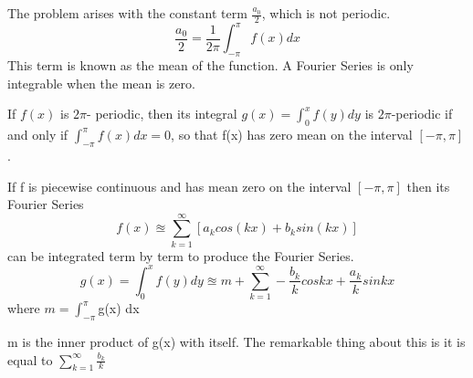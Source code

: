 \documentclass{report}
\begin{document}
The problem arises with the constant term $\frac{a_0}{2}$, which is not periodic.
\[
   \frac{a_0}{2} = \frac{1}{2\pi} \int_{-\pi}^{\pi} f(x) dx
\]
This term is known as the mean of the function. A Fourier Series is only integrable when the mean is zero.
\begin{lemma}
   If $f(x)$  is $2\pi$- periodic, then its integral $g(x) = \int_0^{x} f(y) dy$ is $2\pi$-periodic if and only if $\int_{-\pi}^\pi f(x) dx = 0$, so that f(x) has zero mean on the interval $[-\pi,\pi]$.
\end{lemma}
\begin{theorem}
   If f is piecewise continuous and has mean zero on the interval $[-\pi,\pi]$ then its Fourier Series  
	\begin{displaymath}
	   f(x) \approxeq \sum_{k=1}^{\infty} [a_k cos(kx) + b_k sin(kx)]
	\end{displaymath}
	can be integrated term by term to produce the Fourier Series. 
	\[
	   g(x) = \int_0^{x} f(y) dy \approxeq m + \sum_{k=1}^{\infty} - \frac{b_k}{k} cos kx + \frac{a_k}{k} sin kx
	\]
	where $m = \int_{-\pi}^{\pi}$g(x) dx
\end{theorem}
\begin{note}
   m is the inner product of g(x) with itself. The remarkable thing about this is it is equal to $\sum_{k=1}^{\infty} \frac{b_k}{k}$
\end{note}
\end{document}
